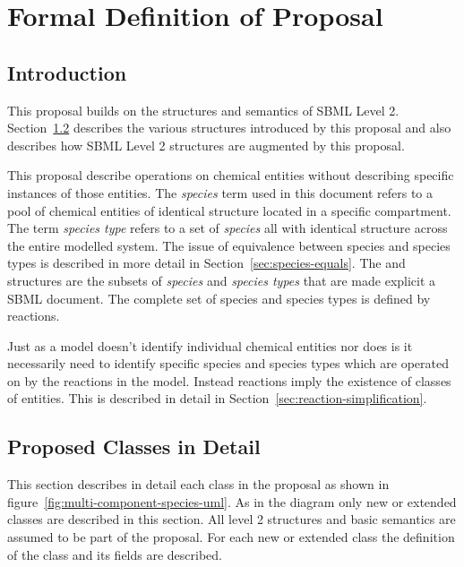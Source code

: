\documentclass{cekarticle}
\begin{document}
\clearpage


\section{Formal Definition of Proposal}
\label{sec:definitions}

\subsection{Introduction}
\label{sec:defintro}

This proposal builds on the structures and semantics of SBML Level
2.  Section~\ref{sec:class-in-detail} describes the various
structures introduced by this proposal and also describes how SBML
Level 2 structures are augmented by this proposal.

This proposal describe operations on chemical entities without
describing specific instances of those entities.  The
\emph{species} term used in this document refers to a pool of
chemical entities of identical structure located in a specific
compartment.  The term \emph{species type} refers to a set of
\emph{species} all with identical structure across the entire
modelled system.  The issue of equivalence between species and
species types is described in more detail in
Section~\ref{sec:species-equals}.  The  and
 structures are the subsets of \emph{species}
and \emph{species types} that are made explicit a SBML document.
The complete set of species and species types is defined by
reactions.

Just as a model doesn't identify individual chemical entities nor
does is it necessarily need to identify specific species and
species types which are operated on by the reactions in the model.
Instead reactions imply the existence of classes of entities. This
is described in detail in
Section~\ref{sec:reaction-simplification}.

\subsection{Proposed Classes in Detail}
\label{sec:class-in-detail}
This section describes in detail each
class in the proposal as shown in
figure~\ref{fig:multi-component-species-uml}. As in the diagram
only new or extended classes are described in this section. All
level 2 structures and basic semantics are assumed to be part of
the proposal. For each new or extended class the definition of the
class and its fields are described.
\end{document}
